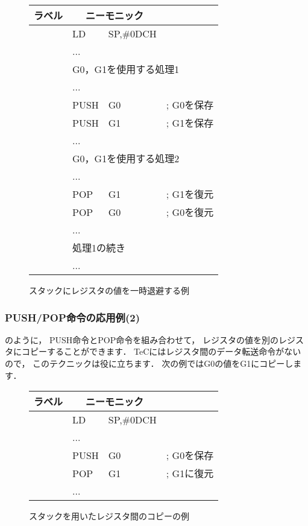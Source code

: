 \begin{figure}[bt]
{\tt\small\begin{center}
\begin{tabular}{|l|l l l|}
\hline
ラベル & \multicolumn{2}{|c}{ニーモニック} & \\
\hline
    & LD   & SP,\#0DCH&            \\
    & ...  &          &            \\
    & \multicolumn{3}{|l|}{G0，G1を使用する処理1} \\
    & ...  &          &            \\
    & PUSH & G0       & ; G0を保存 \\
    & PUSH & G1       & ; G1を保存 \\
    & ...  &        & \\
    & \multicolumn{3}{|l|}{G0，G1を使用する処理2} \\
    & ...  &          &            \\
    & POP  & G1       & ; G1を復元 \\
    & POP  & G0       & ; G0を復元 \\
    & ...  &        & \\
    & \multicolumn{3}{|l|}{処理1の続き} \\
    & ...  &          &            \\
\hline
\end{tabular}
\end{center}}
\caption{スタックにレジスタの値を一時退避する例}
\label{fig:chap6:regsave}
\end{figure}

\subsubsection{PUSH/POP命令の応用例(2)}
のように，
PUSH命令とPOP命令を組み合わせて，
レジスタの値を別のレジスタにコピーすることができます．
TeCにはレジスタ間のデータ転送命令がないので，
このテクニックは役に立ちます．
次の例ではG0の値をG1にコピーします．

\begin{figure}[bt]
{\tt\small\begin{center}
\begin{tabular}{|l|l l l|}
\hline
ラベル & \multicolumn{2}{|c}{ニーモニック} & \\
\hline
    & LD   & SP,\#0DCH&            \\
    & ...  &          &            \\
    & PUSH & G0       & ; G0を保存 \\
    & POP  & G1       & ; G1に復元 \\
    & ...  &        & \\
\hline
\end{tabular}
\end{center}}
\caption{スタックを用いたレジスタ間のコピーの例}
\label{fig:chap6:regcopy}
\end{figure}

